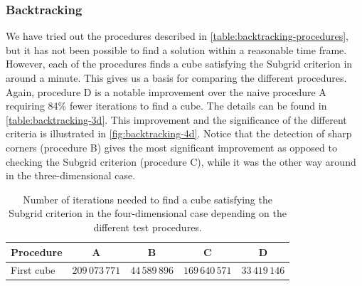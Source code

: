 \subsubsection{Backtracking}
We have tried out the procedures described in \cref{table:backtracking-procedures}, but it has not been possible to find a solution within a reasonable time frame. However, each of the procedures finds a cube satisfying the Subgrid criterion  in around a minute. This gives us a basis for comparing the different procedures. Again, procedure D is a notable improvement over the naive procedure A requiring 84\% fewer iterations to find a cube. The details can be found in \cref{table:backtracking-3d}. This improvement and the significance of the different criteria is illustrated in \cref{fig:backtracking-4d}. Notice that the detection of sharp corners (procedure B) gives the most significant improvement as opposed to checking the Subgrid criterion  (procedure C), while it was the other way around in the three-dimensional case.
\begin{table}[ht]
\centering
\caption{Number of iterations needed to find a cube satisfying the Subgrid criterion  in the four-dimensional case depending on the different test procedures.}
\label{table:backtracking-cubes-4d}
\bgroup
\def\arraystretch{1.1}
\begin{tabular}{|l|c|c|c|c|}
\hline
Procedure  & A  & B & C & D \\ \hline
First cube  & $209\,073\,771$ & $44\,589\,896$ & $169\,640\,571$ & $33\,419\,146$ \\ \hline
\end{tabular}
\egroup
\end{table}

